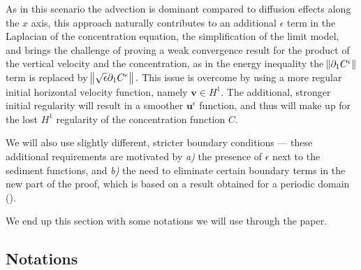 \documentclass[11pt]{article}
\begin{document}

As in this scenario the advection is dominant compared to diffusion effects along the $x$ axis, this approach naturally contributes to an additional $\epsilon$ term in the Laplacian of the concentration equation, the simplification of the limit model, and brings the challenge of proving a weak convergence result for the product of the vertical velocity and the concentration, as in the energy inequality the $\norm{\partial_1 C^\epsilon}$ term is replaced by $\norm{\sqrt{\epsilon} \partial_1 C^\epsilon}.$ This issue is overcome by using a more regular initial horizontal velocity function, namely $\mathbf{v} \in H^1.$ The additional, stronger initial regularity will result in a smoother $\mathbf{u}^\epsilon$ function, and thus will make up for the lost $H^1$ regularity of the concentration function $C.$

We will also use slightly different, stricter boundary conditions --- these additional requirements are motivated by \textit{a)} the presence of $\epsilon$ next to the sediment functions, and \textit{b)} the need to eliminate certain boundary terms in the new part of the proof, which is based on a result obtained for a periodic domain (\cite{li2019primitive}).

We end up this section with some notations we will use through the paper.

\subsection{Notations}
\end{document}

